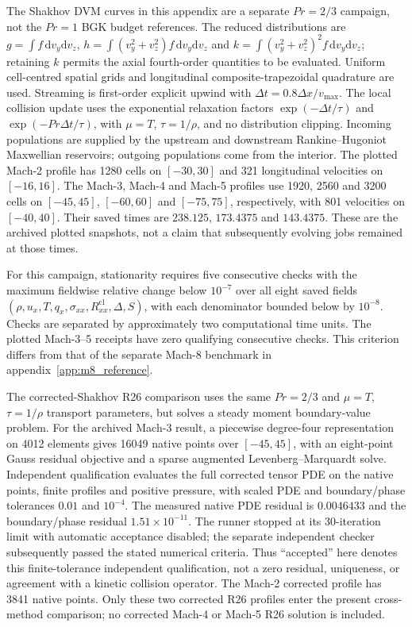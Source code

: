 \documentclass[lineno,paper]{JFM-FLM_Au}
\newenvironment{revision}{\nolinenumbers\begin{tcolorbox}[breakable,colback=revisionyellow,colframe=revisionyellow,boxrule=0pt,arc=0pt,left=5pt,right=5pt,top=5pt,bottom=5pt,before skip=6pt,after skip=6pt]\captionsetup{width=\linewidth}}{\end{tcolorbox}\linenumbers}
\newenvironment{revision}{}{}
\newcommand{\dd}{\mathrm{d}}
\newcommand{\cl}{\mathrm{cl}}
\begin{document}
\begin{revision}
The Shakhov DVM curves in this appendix are a separate $Pr=2/3$ campaign, not the $Pr=1$ BGK budget references. The reduced distributions are $g=\int f\,\dd v_y\dd v_z$, $h=\int(v_y^2+v_z^2)f\,\dd v_y\dd v_z$ and $k=\int(v_y^2+v_z^2)^2f\,\dd v_y\dd v_z$; retaining $k$ permits the axial fourth-order quantities to be evaluated. Uniform cell-centred spatial grids and longitudinal composite-trapezoidal quadrature are used. Streaming is first-order explicit upwind with $\Delta t=0.8\Delta x/v_{\max}$. The local collision update uses the exponential relaxation factors $\exp(-\Delta t/\tau)$ and $\exp(-Pr\Delta t/\tau)$, with $\mu=T$, $\tau=1/\rho$, and no distribution clipping. Incoming populations are supplied by the upstream and downstream Rankine--Hugoniot Maxwellian reservoirs; outgoing populations come from the interior. The plotted Mach-2 profile has 1280 cells on $[-30,30]$ and 321 longitudinal velocities on $[-16,16]$. The Mach-3, Mach-4 and Mach-5 profiles use 1920, 2560 and 3200 cells on $[-45,45]$, $[-60,60]$ and $[-75,75]$, respectively, with 801 velocities on $[-40,40]$. Their saved times are $238.125$, $173.4375$ and $143.4375$. These are the archived plotted snapshots, not a claim that subsequently evolving jobs remained at those times.

For this campaign, stationarity requires five consecutive checks with the maximum fieldwise relative change below $10^{-7}$ over all eight saved fields $(\rho,u_x,T,q_x,\sigma_{xx},R^{\cl}_{xx},\Delta,S)$, with each denominator bounded below by $10^{-8}$. Checks are separated by approximately two computational time units. The plotted Mach-3--5 receipts have zero qualifying consecutive checks. This criterion differs from that of the separate Mach-8 benchmark in appendix~\ref{app:m8_reference}.

The corrected-Shakhov R26 comparison uses the same $Pr=2/3$ and $\mu=T$, $\tau=1/\rho$ transport parameters, but solves a steady moment boundary-value problem. For the archived Mach-3 result, a piecewise degree-four representation on 4012 elements gives 16049 native points over $[-45,45]$, with an eight-point Gauss residual objective and a sparse augmented Levenberg--Marquardt solve. Independent qualification evaluates the full corrected tensor PDE on the native points, finite profiles and positive pressure, with scaled PDE and boundary/phase tolerances $0.01$ and $10^{-4}$. The measured native PDE residual is $0.0046433$ and the boundary/phase residual $1.51\times10^{-11}$. The runner stopped at its 30-iteration limit with automatic acceptance disabled; the separate independent checker subsequently passed the stated numerical criteria. Thus ``accepted'' here denotes this finite-tolerance independent qualification, not a zero residual, uniqueness, or agreement with a kinetic collision operator. The Mach-2 corrected profile has 3841 native points. Only these two corrected R26 profiles enter the present cross-method comparison; no corrected Mach-4 or Mach-5 R26 solution is included.
\end{revision}
\end{document}
